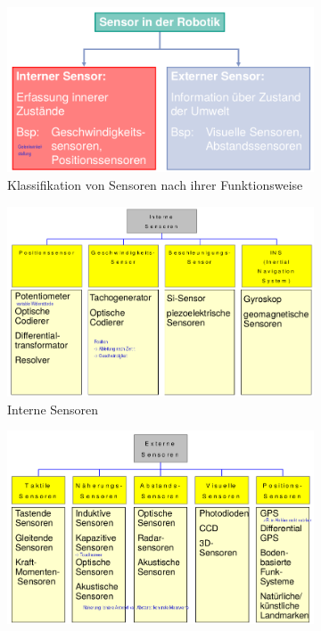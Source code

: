 \begin{figure}[h!]
	\centering
	\begin{subfigure}{.5\textwidth}
		\includegraphics[width=\linewidth]{figures/ch04_sensrob.png}
		\caption{Klassifikation von Sensoren nach ihrer Funktionsweise}
	\end{subfigure}
	\begin{subfigure}{.5\textwidth}
		\includegraphics[width=\linewidth]{figures/ch04_intern.png}
		\caption{Interne Sensoren}
	\end{subfigure}
	\begin{subfigure}{.5\textwidth}
		\includegraphics[width=\linewidth]{figures/ch04_extern.png}

\end{subfigure}
\end{figure}
